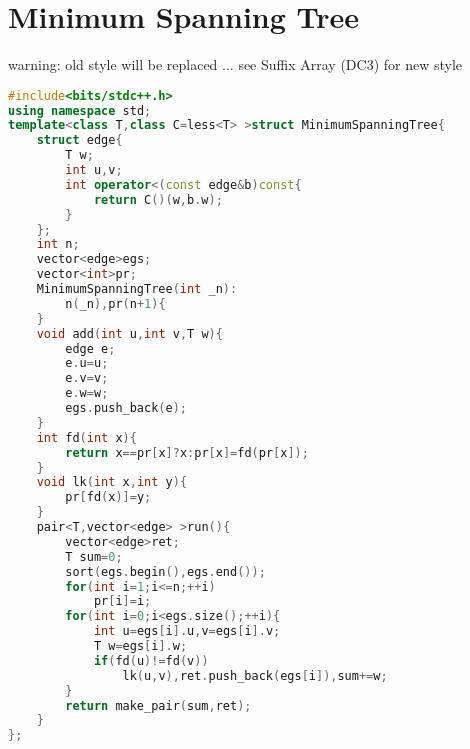 \documentclass{book}
\begin{document}
\section{Minimum Spanning Tree}
warning: old style will be replaced ... see Suffix Array (DC3) for new style\begin{lstlisting}[language=C++,title={Minimum Spanning Tree.hpp (1049 bytes, 44 lines)}]
#include<bits/stdc++.h>
using namespace std;
template<class T,class C=less<T> >struct MinimumSpanningTree{
    struct edge{
        T w;
        int u,v;
        int operator<(const edge&b)const{
            return C()(w,b.w);
        }
    };
    int n;
    vector<edge>egs;
    vector<int>pr;
    MinimumSpanningTree(int _n):
        n(_n),pr(n+1){
    }
    void add(int u,int v,T w){
        edge e;
        e.u=u;
        e.v=v;
        e.w=w;
        egs.push_back(e);
    }
    int fd(int x){
        return x==pr[x]?x:pr[x]=fd(pr[x]);
    }
    void lk(int x,int y){
        pr[fd(x)]=y;
    }
    pair<T,vector<edge> >run(){
        vector<edge>ret;
        T sum=0;
        sort(egs.begin(),egs.end());
        for(int i=1;i<=n;++i)
            pr[i]=i;
        for(int i=0;i<egs.size();++i){
            int u=egs[i].u,v=egs[i].v;
            T w=egs[i].w;
            if(fd(u)!=fd(v))
                lk(u,v),ret.push_back(egs[i]),sum+=w;
        }
        return make_pair(sum,ret);
    }
};
\end{lstlisting}
\end{document}
